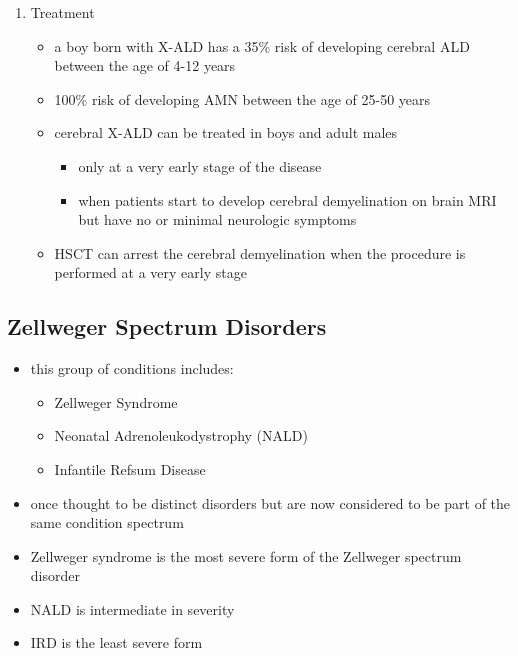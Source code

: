 \documentclass{scrartcl}
\begin{document}
\begin{enumerate}
\item Treatment
\label{sec:orga76f345}
\begin{itemize}
\item a boy born with X-ALD has a 35\% risk of developing cerebral ALD
between the age of 4-12 years
\item 100\% risk of developing AMN between the age of 25-50 years
\item cerebral X-ALD can be treated in boys and adult males
\begin{itemize}
\item only at a very early stage of the disease
\item when patients start to develop cerebral demyelination on brain MRI
but have no or minimal neurologic symptoms
\end{itemize}
\item HSCT can arrest the cerebral demyelination when the procedure is
performed at a very early stage
\end{itemize}
\end{enumerate}

\subsection{Zellweger Spectrum Disorders}
\label{sec:org5ae6497}
\begin{itemize}
\item this group of conditions includes:
\begin{itemize}
\item Zellweger Syndrome
\item Neonatal Adrenoleukodystrophy (NALD)
\item Infantile Refsum Disease
\end{itemize}
\item once thought to be distinct disorders but are now considered to be
part of the same condition spectrum
\item Zellweger syndrome is the most severe form of the Zellweger spectrum disorder
\item NALD is intermediate in severity
\item IRD is the least severe form
\end{itemize}
\end{document}
